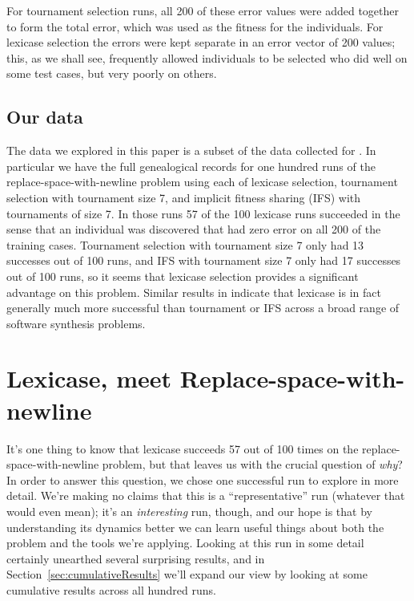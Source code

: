 For tournament selection runs, all 200 of these error values were added together to form the
total error, which was used as the fitness for the individuals. For lexicase selection the errors
were kept separate in an error vector of 200 values; this, as we shall see, frequently allowed individuals to be selected who did 
well on some test cases, but very poorly on others.

\subsection{Our data}
\label{sec:ourData}

The data we explored in this paper is a subset of the data collected for \citep{Helmuth:2015:GPTP}. In particular
we have the full genealogical records for one hundred runs of the replace-space-with-newline problem using each 
of lexicase selection, tournament
selection with tournament size 7, and implicit fitness sharing (IFS) with tournaments of size 7. In those
runs 57 of the 100 lexicase runs succeeded in the sense that an individual was discovered that had zero
error on all 200 of the training cases. Tournament selection with tournament size 7 only
had 13 successes out of 100 runs, and IFS with tournament size 7 only had 17 successes out of 100 runs, so it seems that
lexicase selection provides a significant advantage on this problem. Similar results in \citep{Helmuth:2015:GECCO}
indicate that lexicase is in fact generally much more successful than tournament or IFS across a broad range of
software synthesis problems.

\section{Lexicase, meet Replace-space-with-newline}
\label{sec:lexicaseRun}


It's one thing to know that lexicase succeeds 57 out of 100 times on the replace-space-with-newline problem, but that
leaves us with the crucial question of \emph{why}? In order to answer this question, we chose one successful 
run to explore in more detail.
We're making no claims that this is a ``representative'' run (whatever that would even
mean); it's an \emph{interesting} run, though, and our hope is that by understanding its dynamics
better we can learn useful things about both the problem and the tools we're applying. Looking at this run in some
detail certainly unearthed several surprising results, and in Section~\ref{sec:cumulativeResults}
we'll expand our view by looking at some cumulative results across all hundred runs.

